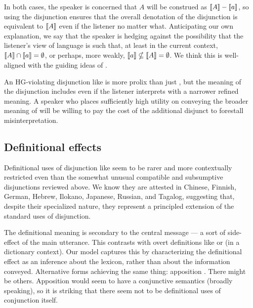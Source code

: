 \documentclass{article}
\begin{document}
In both cases, the speaker is concerned that $A$ will be construed as
$\llbracket A\rrbracket-\llbracket a\rrbracket$, so using the disjunction ensures that the overall
denotation of the disjunction is equivalent to $\llbracket A\rrbracket$ even if the
listener no matter what. Anticipating our own explanation, we say that
the speaker is hedging against the possibility that the listener's
view of language is such that, at least in the current context,
$\llbracket A\rrbracket \cap \llbracket a\rrbracket = \emptyset$, or perhaps, more weakly, $ \llbracket a\rrbracket
\nsubseteq \llbracket A\rrbracket = \emptyset$. We think this is well-aligned with
the guiding ideas of \citet{Chemla-HurfordCounts}.

An HG-violating disjunction like  is more prolix
than just , but the meaning of the disjunction includes
 even if the listener interprets  with a
narrower refined meaning.  A speaker who places sufficiently high
utility on conveying the broader meaning of  will be
willing to pay the cost of the additional disjunct to forestall
misinterpretation.
 

\subsection{Definitional effects}\label{sec:data:definitional}

Definitional uses of disjunction like 
seem to be rarer and more contextually restricted even than the
somewhat unusual compatible and subsumptive disjunctions reviewed
above. We know they are attested in Chinese, Finnish, German, Hebrew,
Ilokano, Japanese, Russian, and Tagalog, suggesting that, despite
their specialized nature, they represent a principled extension of the
standard uses of disjunction.

The definitional meaning is secondary to the central message --- a
sort of side-effect of the main utterance. This contrasts with overt
definitions like  or
 (in a dictionary context). Our model
captures this by characterizing the definitional effect as an
inference about the lexicon, rather than about the information
conveyed. Alternative forms achieving the same thing: apposition
. There might be others. Apposition
would seem to have a conjunctive semantics (broadly speaking), so it
is striking that there seem not to be definitional uses of conjunction
itself.
\end{document}
